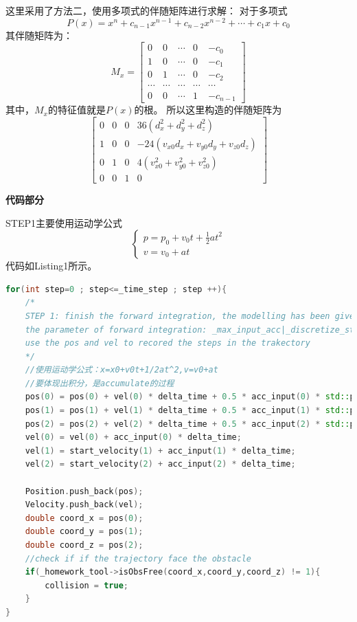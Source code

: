 \documentclass[40pt,a4paper,UTF8]{ctexart}
\numberwithin{equation}{section}
\begin{document}
这里采用了方法二，使用多项式的伴随矩阵进行求解：
对于多项式
\begin{equation}
    P(x)=x^n+c_{n-1}x^{n-1}+c_{n-2}x^{n-2}+\cdots +c_1x+c_0
\end{equation}
其伴随矩阵为：
\begin{equation}
    M_x = 
    \begin{bmatrix}
        0 & 0 & \cdots & 0& -c_0 \\
        1 & 0 & \cdots & 0& -c_1 \\
        0 & 1 & \cdots & 0& -c_2 \\
        \cdots & \cdots & \cdots & \cdots & \cdots\\
        0 & 0& \cdots & 1 & -c_{n-1}
    \end{bmatrix}
\end{equation}
其中，$M_x$的特征值就是$P(x)$的根。
所以这里构造的伴随矩阵为
\begin{equation}
    \begin{bmatrix}
        0&0&0&36(d_x^2+d_y^2+d_z^2)\\
        1&0&0&-24(v_{x0}d_x+v_{y0}d_y+v_{z0}d_z)\\
        0&1&0&4(v_{x0}^2+v_{y0}^2+v_{z0}^2)\\
        0&0&1&0
    \end{bmatrix}
\end{equation}


\textbf{代码部分}

STEP1主要使用运动学公式
\begin{equation}
    \left\{
    \begin{array}{l}
    p=p_0+v_0t+\frac{1}{2}at^2\\
    v=v_0+at
    \end{array}
    \right.
\end{equation}
代码如Listing1所示。
\begin{lstlisting}[language=C++, caption=demo\_node.cpp/trajectoryLibrary()]
for(int step=0 ; step<=_time_step ; step ++){
    /*
    STEP 1: finish the forward integration, the modelling has been given in the document
    the parameter of forward integration: _max_input_acc|_discretize_step|_time_interval|_time_step   all have been given
    use the pos and vel to recored the steps in the trakectory
    */
    //使用运动学公式：x=x0+v0t+1/2at^2,v=v0+at
    //要体现出积分，是accumulate的过程
    pos(0) = pos(0) + vel(0) * delta_time + 0.5 * acc_input(0) * std::pow(delta_time, 2);
    pos(1) = pos(1) + vel(1) * delta_time + 0.5 * acc_input(1) * std::pow(delta_time, 2);
    pos(2) = pos(2) + vel(2) * delta_time + 0.5 * acc_input(2) * std::pow(delta_time, 2);
    vel(0) = vel(0) + acc_input(0) * delta_time;
    vel(1) = start_velocity(1) + acc_input(1) * delta_time;
    vel(2) = start_velocity(2) + acc_input(2) * delta_time;

    Position.push_back(pos);
    Velocity.push_back(vel);
    double coord_x = pos(0);
    double coord_y = pos(1);
    double coord_z = pos(2);
    //check if if the trajectory face the obstacle
    if(_homework_tool->isObsFree(coord_x,coord_y,coord_z) != 1){
        collision = true;
    }
}
\end{lstlisting}
\end{document}
